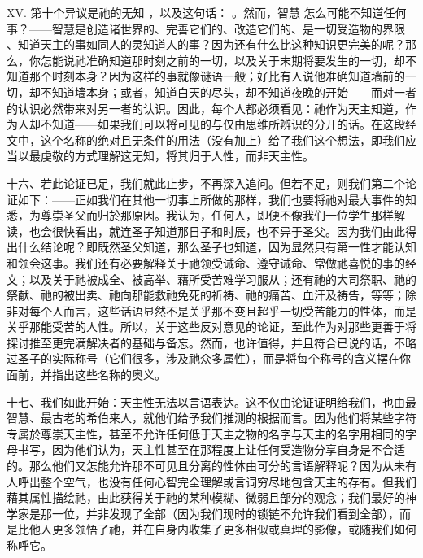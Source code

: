 XV. 第十个异议是祂的无知 ，以及这句话： 。然而，智慧  怎么可能不知道任何事？——智慧是创造诸世界的、完善它们的、改造它们的、是一切受造物的界限 、知道天主的事如同人的灵知道人的事？因为还有什么比这种知识更完美的呢？那么，你怎能说祂准确知道那时刻之前的一切，以及关于末期将要发生的一切，却不知道那个时刻本身？因为这样的事就像谜语一般；好比有人说他准确知道墙前的一切，却不知道墙本身；或者，知道白天的尽头，却不知道夜晚的开始——而对一者的认识必然带来对另一者的认识。因此，每个人都必须看见：祂作为天主知道，作为人却不知道——如果我们可以将可见的与仅由思维所辨识的分开的话。在这段经文中，这个名称的绝对且无条件的用法（没有加上）给了我们这个想法，即我们应当以最虔敬的方式理解这无知，将其归于人性，而非天主性。\par

十六、若此论证已足，我们就此止步，不再深入追问。但若不足，则我们第二个论证如下：——正如我们在其他一切事上所做的那样，我们也要将祂对最大事件的知悉，为尊崇圣父而归於那原因。我认为，任何人，即便不像我们一位学生那样解读，也会很快看出，就连圣子知道那日子和时辰，也不异于圣父。因为我们由此得出什么结论呢？即既然圣父知道，那么圣子也知道，因为显然只有第一性才能认知和领会这事。我们还有必要解释关于祂领受诫命、遵守诫命、常做祂喜悦的事的经文；以及关于祂被成全、被高举、藉所受苦难学习服从；还有祂的大司祭职、祂的祭献、祂的被出卖、祂向那能救祂免死的祈祷、祂的痛苦、血汗及祷告，等等；除非对每个人而言，这些话语显然不是关乎那不变且超乎一切受苦能力的性体，而是关乎那能受苦的人性。所以，关于这些反对意见的论证，至此作为对那些更善于将探讨推至更完满解决者的基础与备忘。然而，也许值得，并且符合已说的话，不略过圣子的实际称号（它们很多，涉及祂众多属性），而是将每个称号的含义摆在你面前，并指出这些名称的奥义。\par

十七、我们如此开始：天主性无法以言语表达。这不仅由论证证明给我们，也由最智慧、最古老的希伯来人，就他们给予我们推测的根据而言。因为他们将某些字符专属於尊崇天主性，甚至不允许任何低于天主之物的名字与天主的名字用相同的字母书写，因为他们认为，天主性甚至在那程度上让任何受造物分享自身是不合适的。那么他们又怎能允许那不可见且分离的性体由可分的言语解释呢？因为从未有人呼出整个空气，也没有任何心智完全理解或言词穷尽地包含天主的存有。但我们藉其属性描绘祂，由此获得关于祂的某种模糊、微弱且部分的观念；我们最好的神学家是那一位，并非发现了全部（因为我们现时的锁链不允许我们看到全部），而是比他人更多领悟了祂，并在自身内收集了更多相似或真理的影像，或随我们如何称呼它。\par


